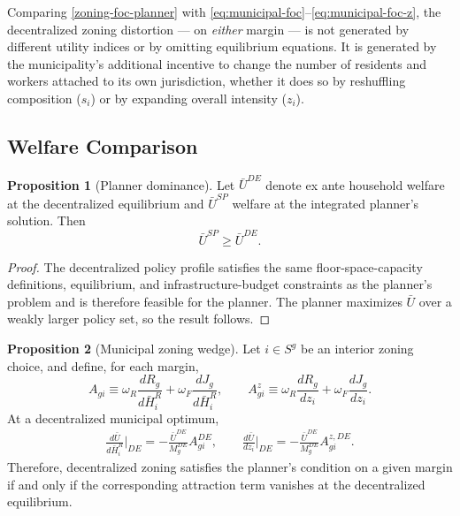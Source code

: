 \documentclass[12pt, a4paper]{article}
\theoremstyle{definition}
\newtheorem{proposition}{Proposition}
\theoremstyle{remark}
\begin{document}
Comparing \eqref{zoning-foc-planner} with \eqref{eq:municipal-foc}--\eqref{eq:municipal-foc-z}, the decentralized zoning distortion — on \emph{either} margin — is not generated by different utility indices or by omitting equilibrium equations. It is generated by the municipality's additional incentive to change the number of residents and workers attached to its own jurisdiction, whether it does so by reshuffling composition ($s_i$) or by expanding overall intensity ($z_i$).


\subsection{Welfare Comparison}

\begin{proposition}[Planner dominance]
\label{prop:SP-dominance}
Let $\bar U^{DE}$ denote ex ante household welfare at the decentralized equilibrium and $\bar U^{SP}$ welfare at the integrated planner's solution. Then
\[
\bar U^{SP}\geq \bar U^{DE}.
\]
\end{proposition}

\begin{proof}
The decentralized policy profile satisfies the same floor-space-capacity definitions, equilibrium, and infrastructure-budget constraints as the planner's problem and is therefore feasible for the planner. The planner maximizes $\bar U$ over a weakly larger policy set, so the result follows.
\end{proof}

\begin{proposition}[Municipal zoning wedge]
\label{prop:municipal-wedge}
Let $i\in S^g$ be an interior zoning choice, and define, for each margin,
\[
A_{gi}
\equiv
\omega_R\frac{dR_g}{d\bar H_i^R}
+
\omega_F\frac{dJ_g}{d\bar H_i^R},
\qquad
A_{gi}^z
\equiv
\omega_R\frac{dR_g}{dz_i}
+
\omega_F\frac{dJ_g}{dz_i}.
\]
At a decentralized municipal optimum,
\begin{align}
    \label{eq:welfare-gradient-at-DE}
    \frac{d\bar U}{d\bar H_i^R}\bigg|_{DE}
    =
    -
    \frac{\bar U^{DE}}{M_g^{DE}}A_{gi}^{DE},
    \qquad
    \frac{d\bar U}{dz_i}\bigg|_{DE}
    =
    -
    \frac{\bar U^{DE}}{M_g^{DE}}A_{gi}^{z,DE}.
\end{align}
Therefore, decentralized zoning satisfies the planner's condition on a given margin if and only if the corresponding attraction term vanishes at the decentralized equilibrium.
\end{proposition}
\end{document}
